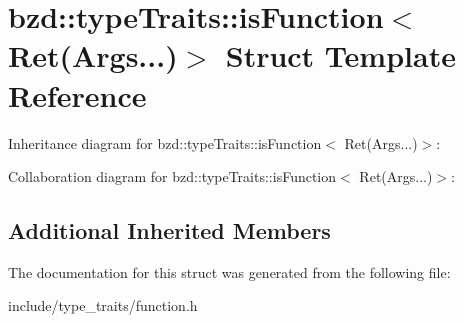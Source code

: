 \hypertarget{structbzd_1_1typeTraits_1_1isFunction_3_01Ret_07Args_8_8_8_08_4}{}\section{bzd\+:\+:type\+Traits\+:\+:is\+Function$<$ Ret(Args...)$>$ Struct Template Reference}
\label{structbzd_1_1typeTraits_1_1isFunction_3_01Ret_07Args_8_8_8_08_4}


Inheritance diagram for bzd\+:\+:type\+Traits\+:\+:is\+Function$<$ Ret(Args...)$>$\+:


Collaboration diagram for bzd\+:\+:type\+Traits\+:\+:is\+Function$<$ Ret(Args...)$>$\+:
\subsection*{Additional Inherited Members}


The documentation for this struct was generated from the following file\+:\begin{DoxyCompactItemize}
\item 
include/type\+\_\+traits/function.\+h\end{DoxyCompactItemize}
